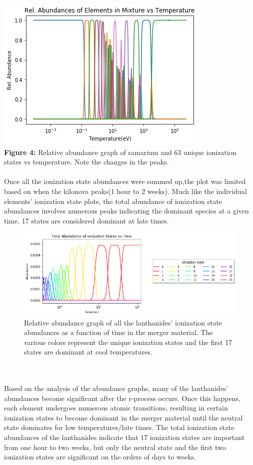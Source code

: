 \documentclass[11pt,a4paper]{article}
\begin{document}
\includegraphics[width=.75\textwidth]{samarium.png}\\
\scriptsize{\textbf{Figure 4:} Relative abundance graph of samarium and 63 unique ionization states vs temperature. Note the changes in the peaks.}\\\\
\normalsize Once all the ionization state abundances were summed up,the plot was limited based on when the kilonova peaks(1 hour to 2 weeks). Much like the individual elements' ionization state plots, the total abundance of ionization state abundances involves numerous peaks indicating the dominant species at a given time. 17 states are considered dominant at late times.

\begin{figure}[h!]
  \includegraphics[width=1\textwidth]{total.png}
  \setcounter{figure}{4}
  \caption{Relative abundance graph of all the lanthanides’ ionization state abundances as a function of time in the merger material. The various colors represent the unique ionization states and the first 17 states are dominant at cool temperatures.}
\end{figure}

\newpage

\\\\
Based on the analysis of the abundance graphs, many of the lanthanides’ abundances become significant after the r-process occurs. Once this happens, each element undergoes numerous atomic transitions, resulting in certain ionization states to become dominant in the merger material until the neutral state dominates for low temperatures/late times. The total ionization state abundances of the lanthanides indicate that 17 ionization states are important from one hour to two weeks, but only the neutral state and the first two ionization states are significant on the orders of days to weeks. 



\end{document}
